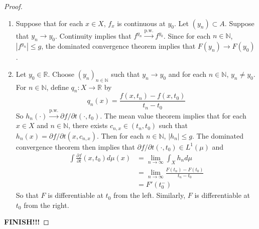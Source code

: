 \documentclass{book}
\theoremstyle{definition}
\newcommand{\N}{\mathbb{N}}
\newcommand{\R}{\mathbb{R}}
\DeclareMathOperator*{\0}{\mbf{0}}
\DeclareMathOperator*{\1}{\mbf{1}}
\newcommand{\p}{\partial}
\newcommand{\limn}{\lim \limits_{n \rightarrow \infty}}
\newcommand{\convt}[1]{\xrightarrow{\text{#1}}}
\begin{document}
	\begin{proof}\
	\begin{enumerate}
	\item Suppose that for each $x \in X$, $f_x$ is continuous at $y_0$. Let $(y_n) \subset A$. Suppose that $y_n \rightarrow y_0$. Continuity implies that $f^{y_n} \convt{p.w.} f^{y_0}$. Since for each $n \in \N$, $|f^{y_n}| \leq g$, the dominated convergence theorem implies that $F(y_n) \rightarrow F(y_0)$.
	\item Let $y_0 \in \R$. Choose $(y_n)_{n \in \N}$ such that $ y_n \rightarrow y_0$ and for each $n \in \N$, $y_n \neq y_0$. For $n \in \N$, define $q_n:X \rightarrow \R$ by 
	$$q_n(x) = \frac{f(x,t_n) - f(x, t_0)}{t_n - t_0}$$ So $h_n(\cdot) \convt{p.w.} \p f / \p t (\cdot, t_0)$. The mean value theorem implies that for each $x \in X$ and $n \in \N$, there exists $c_{n,x} \in (t_n,t_0)$ such that $h_n(x) = \p f / \p t (x, c_{n,x})$. Then for each $n \in \N$, $|h_n| \leq g$. The dominated convergence theorem then implies that $\p f / \p t (\cdot, t_0) \in L^1(\mu)$ and 
	\begin{align*}
	\int \frac{\p f }{\p t} (x, t_0) d\mu(x) 
	&=  \limn \int_X h_n d\mu  \\
	&= \limn \frac{F(t_n) - F(t_0)}{t_n - t_0} \\
	&= F'(t_0^-) 	
	\end{align*}
	So that $F$ is differentiable at $t_0$ from the left. Similarly, $F$ is differentiable at $t_0$ from the right. 
	\end{enumerate}
	\textbf{FINISH!!!}
	\end{proof}





















	




















	
	
\end{document}
